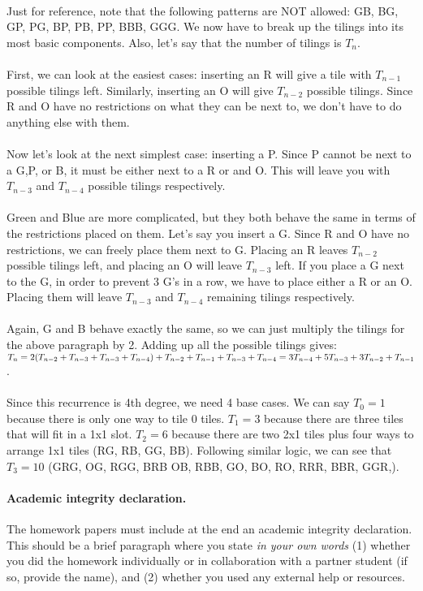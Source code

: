 \documentclass[11pt]{article}
\begin{document}
\begin{solution}
	\\ Just for reference, note that the following patterns are NOT allowed: GB, BG, GP, PG, BP, PB, PP, BBB, GGG. We now have to break up the tilings into its most basic components. Also, let's say that the number of tilings is $T_n$. 
	\\\\ First, we can look at the easiest cases: inserting an R will give a tile with $T_{n-1}$ possible tilings left. Similarly, inserting an O will give $T_{n-2}$ possible tilings. Since R and O have no restrictions on what they can be next to, we don't have to do anything else with them. 
	\\\\ Now let's look at the next simplest case: inserting a P. Since P cannot be next to a G,P, or B, it must be either next to a R or and O. This will leave you with $T_{n-3}$ and $T_{n-4}$ possible tilings respectively. 
	\\\\ Green and Blue are more complicated, but they both behave the same in terms of the restrictions placed on them. Let's say you insert a G. Since R and O have no restrictions, we can freely place them next to G. Placing an R leaves $T_{n-2}$ possible tilings left, and placing an O will leave $T_{n-3}$ left. If you place a G next to the G, in order to prevent 3 G's in a row, we have to place either a R or an O. Placing them will leave $T_{n-3}$ and $T_{n-4}$ remaining tilings respectively. 
	\\\\ Again, G and B behave exactly the same, so we can just multiply the tilings for the above paragraph by 2. Adding up all the possible tilings gives: \\ $T_n = 2(T_{n-2} + T_{n-3} + T_{n-3} + T_{n-4}) + T_{n-2} + T_{n-1} + T_{n-3} + T_{n-4} \\ =  3T_{n-4} + 5T_{n-3} + 3T_{n-2} + T_{n-1}$.
	\\\\ Since this recurrence is 4th degree, we need 4 base cases. We can say $T_0 = 1$ because there is only one way to tile 0 tiles. $T_1 = 3$ because there are three tiles that will fit in a 1x1 slot. $T_2 = 6$ because there are two 2x1 tiles plus four ways to arrange 1x1 tiles (RG, RB, GG, BB). Following similar logic, we can see that $T_3 = 10$ (GRG, OG, RGG, BRB OB, RBB, GO, BO, RO, RRR, BBR, GGR,).
\end{solution}


\vskip 0.1in

\paragraph{Academic integrity declaration.}
The homework papers must include at the end an academic integrity declaration. This should be a brief paragraph where you state
\emph{in your own words}  (1) whether you did the homework individually or in collaboration with a partner student (if so, provide the name), 
and (2) whether you used any external help or resources. 
\end{document}

